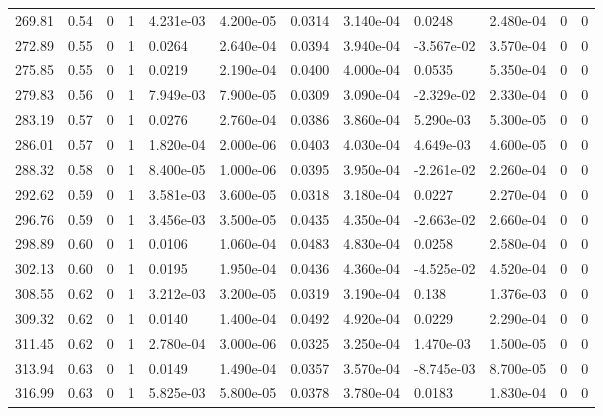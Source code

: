 \documentclass[preview]{standalone}
\begin{document}
{{{{{{{{{{{{{{\begin{tabular}{L{1.2cm}C{1.2cm} C{0.3cm}C{0.5cm} C{1.4cm}C{1.4cm} C{1.4cm}C{1.4cm} C{1.6cm}C{1.6cm} C{1.6cm}C{1.6cm}}
  269.81  &  0.54  & 0     &  1 &  4.231e-03  & 4.200e-05  &  0.0314&   3.140e-04& 0.0248 & 2.480e-04   &  0 & 0  \\ 
  272.89  &  0.55  & 0     &  1 &  0.0264  & 2.640e-04  &  0.0394&   3.940e-04& -3.567e-02 & 3.570e-04   &  0 & 0  \\ 
  275.85  &  0.55  & 0     &  1 &  0.0219  & 2.190e-04  &  0.0400&   4.000e-04& 0.0535 & 5.350e-04   &  0 & 0  \\ 
  279.83  &  0.56  & 0     &  1 &  7.949e-03  & 7.900e-05  &  0.0309&   3.090e-04& -2.329e-02 & 2.330e-04   &  0 & 0  \\ 
  283.19  &  0.57  & 0     &  1 &  0.0276  & 2.760e-04  &  0.0386&   3.860e-04& 5.290e-03 & 5.300e-05   &  0 & 0  \\ 
  286.01  &  0.57  & 0     &  1 &  1.820e-04  & 2.000e-06  &  0.0403&   4.030e-04& 4.649e-03 & 4.600e-05   &  0 & 0  \\ 
  288.32  &  0.58  & 0     &  1 &  8.400e-05  & 1.000e-06  &  0.0395&   3.950e-04& -2.261e-02 & 2.260e-04   &  0 & 0  \\ 
  292.62  &  0.59  & 0     &  1 &  3.581e-03  & 3.600e-05  &  0.0318&   3.180e-04& 0.0227 & 2.270e-04   &  0 & 0  \\ 
  296.76  &  0.59  & 0     &  1 &  3.456e-03  & 3.500e-05  &  0.0435&   4.350e-04& -2.663e-02 & 2.660e-04   &  0 & 0  \\ 
  298.89  &  0.60  & 0     &  1 &  0.0106  & 1.060e-04  &  0.0483&   4.830e-04& 0.0258 & 2.580e-04   &  0 & 0  \\ 
  302.13  &  0.60  & 0     &  1 &  0.0195  & 1.950e-04  &  0.0436&   4.360e-04& -4.525e-02 & 4.520e-04   &  0 & 0  \\ 
  308.55  &  0.62  & 0     &  1 &  3.212e-03  & 3.200e-05  &  0.0319&   3.190e-04& 0.138 & 1.376e-03   &  0 & 0  \\ 
  309.32  &  0.62  & 0     &  1 &  0.0140  & 1.400e-04  &  0.0492&   4.920e-04& 0.0229 & 2.290e-04   &  0 & 0  \\ 
  311.45  &  0.62  & 0     &  1 &  2.780e-04  & 3.000e-06  &  0.0325&   3.250e-04& 1.470e-03 & 1.500e-05   &  0 & 0  \\ 
  313.94  &  0.63  & 0     &  1 &  0.0149  & 1.490e-04  &  0.0357&   3.570e-04& -8.745e-03 & 8.700e-05   &  0 & 0  \\ 
  316.99  &  0.63  & 0     &  1 &  5.825e-03  & 5.800e-05  &  0.0378&   3.780e-04& 0.0183 & 1.830e-04   &  0 & 0  \\ 
\hline 
\end{tabular} 

}}}}}}}}}}}}}}
\end{document}
